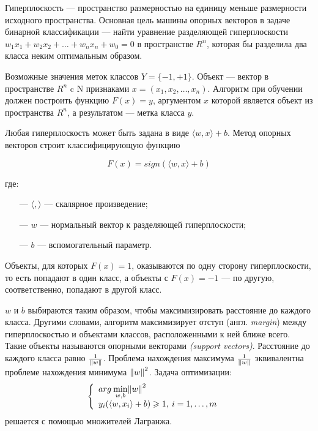 Гиперплоскость — пространство размерностью на единицу меньше размерности исходного пространства.
Основная цель машины опорных векторов в задаче бинарной классификации — найти уравнение разделяющей гиперплоскости $w_1x_1+w_2x_2+…+w_nx_n+w_0=0$
в пространстве $R^n$, которая бы разделила два класса неким оптимальным образом.

Возможные значения меток классов $Y = \{-1, +1\}$. Объект — вектор в пространстве $R^n$ c
N признаками $x = (x_1, x_2, \dots, x_n)$. Алгоритм при обучении должен построить функцию
$F(x)=y$, аргументом $x$ которой является объект из пространства $R^n$, а результатом — метка класса $y$.

Любая гиперплоскость может быть задана в виде $\langle w, x \rangle + b$.
Метод опорных векторов строит классифицирующую функцию

\begin{equation}\label{eq5}
    F(x) = sign(\langle w, x \rangle + b)
\end{equation}

где:
\begin{itemize}
    \item[—] $\langle , \rangle$ — скалярное произведение;
    \item[—] $w$ — нормальный вектор к разделяющей гиперплоскости;
    \item[—] $b$ — вспомогательный параметр.
\end{itemize}

Объекты, для которых $F(x) = 1$, оказываются по одну сторону гиперплоскости,
то есть попадают в один класс, а объекты с $F(x) = -1$ — по другую, соответственно,
попадают в другой класс.

$w$ и $b$ выбираются таким образом, чтобы максимизировать расстояние до каждого класса.
Другими словами, алгоритм максимизирует отступ (англ. \emph{margin}) между гиперплоскостью
и объектами классов, расположенными к ней ближе всего. Такие объекты называются опорными векторами \emph{(support vectors)}.
Расстояние до каждого класса равно $\frac {1}{\Arrowvert w \Arrowvert}$. Проблема нахождения максимума
$\frac {1}{\Arrowvert w \Arrowvert}$ эквивалентна проблеме нахождения минимума ${\Arrowvert w \Arrowvert}^2$.
Задача оптимизации:
\begin{equation}\label{eq6}
    \left\{ \begin{array}{ll} arg \: \underset{w,b}{\min} {\Arrowvert w \Arrowvert}^2 & \textrm{}\\ y_i(\langle w,x_i \rangle + b) \geqslant 1, \: i = 1, \dots, m \end{array} \right.
\end{equation}
решается с помощью множителей Лагранжа.

